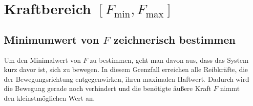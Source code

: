 \documentclass[fleqn,12pt]{article}
\begin{document}


\section[Kraftbereich Fmin bis Fmax]{Kraftbereich $[F_{\min}, F_{\max}]$}
\subsection[Mimimumwert von F zeichnerisch bestimmen]{Minimumwert von $F$ zeichnerisch bestimmen}
\label{sec:fmin}
Um den Minimalwert von $F$ zu bestimmen, geht man davon aus, dass das System kurz davor ist, sich zu bewegen. In diesem Grenzfall erreichen alle Reibkräfte, die der Bewegungsrichtung entgegenwirken, ihren maximalen Haftwert. Dadurch wird die Bewegung gerade noch verhindert und die benötigte äußere Kraft $F$ nimmt den kleinstmöglichen Wert an.
\end{document}
